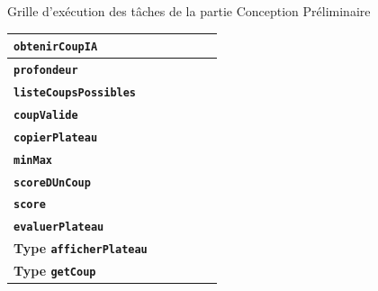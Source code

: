 \documentclass{beamer}
\begin{document}
\begin{frame}[label=cp]
\begin{alertblock}{Grille d’exécution des tâches de la partie Conception Préliminaire}
{\begin{table}[h]
\begin{center}
\begin{tabular}{|l|c|c|c|c|c|}
 		\textbf{\texttt{obtenirCoupIA}} & & & &  \cellcolor{lightgray}&  \cellcolor{lightgray}  \\\hline
 		 		\textbf{\texttt{profondeur}} & & & &  \cellcolor{lightgray}&  \cellcolor{lightgray}  \\\hline
 		 		 		\textbf{\texttt{listeCoupsPossibles}} & & & &  \cellcolor{lightgray}&  \cellcolor{lightgray}  \\\hline
 		  		\textbf{\texttt{coupValide}} & & & &  \cellcolor{lightgray}&  \cellcolor{lightgray}  \\\hline
  		\textbf{\texttt{copierPlateau}} & & & &  \cellcolor{lightgray}&  \cellcolor{lightgray}  \\\hline
   		\textbf{\texttt{minMax}} & & & &  \cellcolor{lightgray}&  \cellcolor{lightgray}  \\\hline
   		 		\textbf{\texttt{scoreDUnCoup}} & & & &  \cellcolor{lightgray}&  \cellcolor{lightgray}  \\\hline
   	 		\textbf{\texttt{score}} & & & &  \cellcolor{lightgray}&  \cellcolor{lightgray}  \\\hline
   	 		 		\textbf{\texttt{evaluerPlateau}} & & & &  \cellcolor{lightgray}&  \cellcolor{lightgray}  \\\hline
   	\textbf{Type \texttt{afficherPlateau}} & \cellcolor{lightgray} & \cellcolor{lightgray} & \cellcolor{lightgray} & & \\\hline
   	 		 \textbf{Type \texttt{getCoup}} & & & & \cellcolor{lightgray}& \cellcolor{lightgray}\\\hline
\end{tabular}
\end{center}
\end{table}}

	\end{alertblock}
	\end{frame}
	
\end{document}
